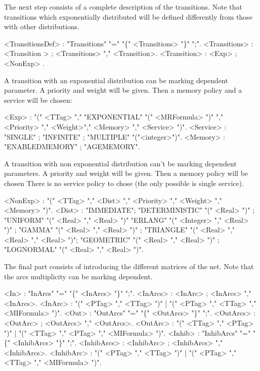 \documentclass[a4paper]{article}
\begin{document}
The next step consists of a complete description of the transitions. Note that transitions
which  exponentially  distributed will be defined differently from  those with other distributions.
\begin{grammar}
[(colon){$::=$ }]
[(semicolon){$|$ }]
[(period){\\ }]
[(quote){"}{" }]
[(nonterminal){$\langle$}{$\rangle$ }]
<TransitionsDef> : "Transitions" "=" "\{" <Transitions> "\}" ";".
<Transitions> : <Transition > ; <Transitions> "," <Transition>.
<Transition> : <Exp> ; <NonExp> .
\end{grammar}

A transition with an exponential distribution can be marking dependent parameter. A priority and weight will be given. Then a memory policy  
and a service will be chosen:
\begin{grammar}
[(colon){$::=$ }]
[(semicolon){$|$ }]
[(period){\\ }]
[(quote){"}{" }]
[(nonterminal){$\langle$}{$\rangle$ }]
<Exp> : "(" <TTag> "," "EXPONENTIAL" "(" <MRFormula> ")" "," <Priority> "," <Weight>"," <Memory>  "," <Service> ")".
<Service> : "SINGLE" ; "INFINITE" ; "MULTIPLE" "("<integer>")".
<Memory> :  "ENABLEDMEMORY" ; "AGEMEMORY".
\end{grammar}

A transition with non exponential distribution can't be marking dependent parameters. A priority and weight will be given. Then  a memory policy 
will be chosen There is no service policy to chose (the only possible is single service). 
\begin{grammar}
[(colon){$::=$ }]
[(semicolon){$|$ }]
[(period){\\ }]
[(quote){"}{" }]
[(nonterminal){$\langle$}{$\rangle$ }]
<NonExp> :  "(" <TTag> "," <Dist> "," <Priority> "," <Weight> "," <Memory>  ")".
<Dist> : "IMMEDIATE"; "DETERMINISTIC" "(" <Real> ")" ; "UNIFORM" "(" <Real> "," <Real> ")"
"ERLANG" "(" <Integer> "," <Real> ")" ; "GAMMA" "(" <Real> "," <Real> ")" ; "TRIANGLE" "(" <Real> "," <Real> "," <Real> ")"; 
"GEOMETRIC" "(" <Real> "," <Real> ")" ; "LOGNORMAL" "(" <Real> "," <Real> ")".
\end{grammar}

The final part consists of introducing the different matrices of the net. Note that the arcs multiplicity can be marking dependent. 
\begin{grammar}
[(colon){$::=$ }]
[(semicolon){$|$ }]
[(period){\\ }]
[(quote){"}{" }]
[(nonterminal){$\langle$}{$\rangle$ }]
<In> : "InArcs" "=" "\{" <InArcs> "\}" ";". 
<InArcs> : <InArc> ; <InArcs> "," <InArcs>.
<InArc> : "(" <PTag> "," <TTag> ")" | "(" <PTag> "," <TTag> "," <MIFormula> ")".
<Out> : "OutArcs" "=" "\{" <OutArcs> "\}" ";". 
<OutArcs> : <OutArc> ; <OutArcs> "," <OutArcs>.
<OutArc> : "(" <TTag> "," <PTag> ")" | "(" <TTag> "," <PTag> "," <MIFormula> ")".
<Inhib> : "InhibArcs" "=" "\{" <InhibArcs> "\}" ";". 
<InhibArcs> : <InhibArc> ; <InhibArcs> "," <InhibArcs>.
<InhibArc> : "(" <PTag> "," <TTag> ")" | "(" <PTag> "," <TTag> "," <MIFormula> ")".
\end{grammar}
\end{document}
